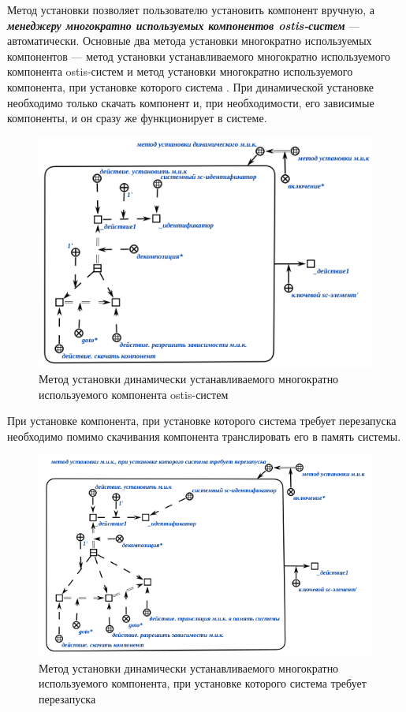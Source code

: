 Метод установки позволяет пользователю установить компонент вручную, а \textbf{\textit{менеджеру многократно используемых компонентов ostis-систем}} --- автоматически. Основные два метода установки многократно используемых компонентов --- метод установки  устанавливаемого многократно используемого компонента ostis-систем и метод установки многократно используемого компонента, при установке которого система . При динамической установке необходимо только скачать компонент и, при необходимости, его зависимые компоненты, и он сразу же функционирует в системе. 

\begin{figure}[H]
	\includegraphics[scale=0.6]{author/part5/figures/install_dynamic_method.png}
	\caption{Метод установки динамически устанавливаемого многократно используемого компонента ostis-систем}
	\label{fig:dynamic_method}
\end{figure}

При установке компонента, при установке которого система требует перезапуска необходимо помимо скачивания компонента транслировать его в память системы.

\begin{figure}[H]
	\includegraphics[scale=0.6]{author/part5/figures/install_with_reboot_method.png}
	\caption{Метод установки динамически устанавливаемого многократно используемого компонента, при установке которого система требует перезапуска}
	\label{fig:install_with_reboot_method}
\end{figure}



